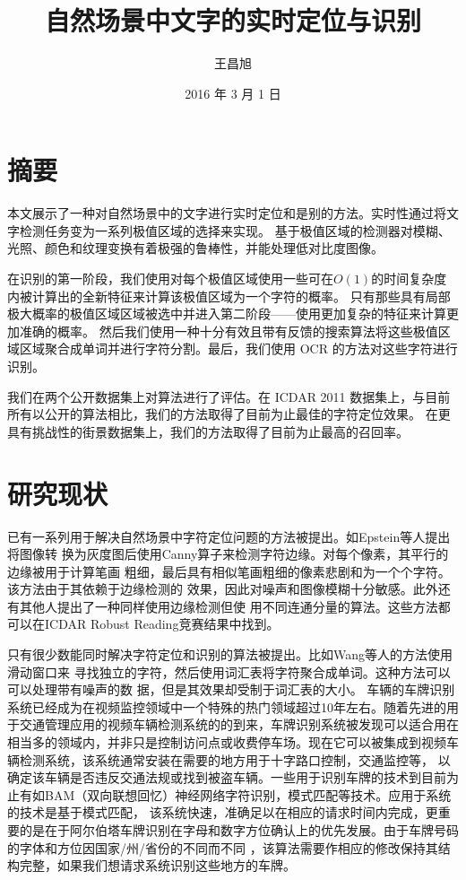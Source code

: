 \documentclass[UTF8]{article}
\author{王昌旭}
\date{2016 年 3 月 1 日}
\title{自然场景中文字的实时定位与识别}
\begin{document}
\maketitle

\section{摘要}

本文展示了一种对自然场景中的文字进行实时定位和是别的方法。实时性通过将文字检测任务变为一系列极值区域的选择来实现。
基于极值区域的检测器对模糊、光照、颜色和纹理变换有着极强的鲁棒性，并能处理低对比度图像。

在识别的第一阶段，我们使用对每个极值区域使用一些可在$O(1)$的时间复杂度内被计算出的全新特征来计算该极值区域为一个字符的概率。
只有那些具有局部极大概率的极值区域区域被选中并进入第二阶段——使用更加复杂的特征来计算更加准确的概率。
然后我们使用一种十分有效且带有反馈的搜索算法将这些极值区域区域聚合成单词并进行字符分割。最后，我们使用 OCR 的方法对这些字符进行识别。

我们在两个公开数据集上对算法进行了评估。在 ICDAR 2011 数据集上，与目前所有以公开的算法相比，我们的方法取得了目前为止最佳的字符定位效果。
在更具有挑战性的街景数据集上，我们的方法取得了目前为止最高的召回率。

\section{研究现状}


已有一系列用于解决自然场景中字符定位问题的方法被提出。如Epstein等人提出将图像转
换为灰度图后使用Canny算子来检测字符边缘。对每个像素，其平行的边缘被用于计算笔画
粗细，最后具有相似笔画粗细的像素悲剧和为一个个字符。该方法由于其依赖于边缘检测的
效果，因此对噪声和图像模糊十分敏感。此外还有其他人提出了一种同样使用边缘检测但使
用不同连通分量的算法。这些方法都可以在ICDAR Robust Reading竞赛结果中找到。

只有很少数能同时解决字符定位和识别的算法被提出。比如Wang等人的方法使用滑动窗口来
寻找独立的字符，然后使用词汇表将字符聚合成单词。这种方法可以可以处理带有噪声的数
据，但是其效果却受制于词汇表的大小。
车辆的车牌识别系统已经成为在视频监控领域中一个特殊的热门领域超过10年左右。随着先进的用于交通管理应用的视频车辆检测系统的的到来，车牌识别系统被发现可以适合用在
相当多的领域内，并非只是控制访问点或收费停车场。现在它可以被集成到视频车辆检测系统，该系统通常安装在需要的地方用于十字路口控制，交通监控等，
以确定该车辆是否违反交通法规或找到被盗车辆。一些用于识别车牌的技术到目前为止有如BAM（双向联想回忆）神经网络字符识别，模式匹配等技术。应用于系统的技术是基于模式匹配，
该系统快速，准确足以在相应的请求时间内完成，更重要的是在于阿尔伯塔车牌识别在字母和数字方位确认上的优先发展。由于车牌号码的字体和方位因国家/州/省份的不同而不同
 ，该算法需要作相应的修改保持其结构完整，如果我们想请求系统识别这些地方的车牌。
\end{document}
